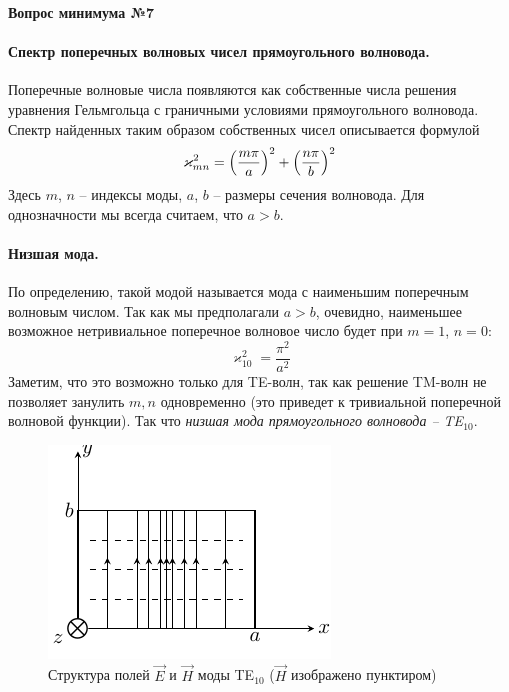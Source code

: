 \documentclass[a4paper,14pt]{extarticle}
\newcommand{\ticket}[1] {
\newpage
\hypertarget{num#1}{}
\begin{center}
	\textbf{Вопрос минимума №#1 }
\end{center}
}
\begin{document}
	





\ticket{7}
\paragraph{Спектр поперечных волновых чисел прямоугольного волновода. } Поперечные волновые числа появляются как собственные числа решения уравнения Гельмгольца с граничными условиями прямоугольного волновода. Спектр найденных таким образом собственных чисел описывается формулой
\begin{equation}
	\varkappa^2_{mn} = \qty(\frac{m\pi}{a})^2+
		\qty(\frac{n\pi}{b})^2
\end{equation}
Здесь $m$, $n$ -- индексы моды, $a$, $b$ -- размеры сечения волновода. Для однозначности мы всегда считаем, что $a>b$.

\paragraph{Низшая мода.} По определению, такой модой называется мода с наименьшим поперечным волновым числом. Так как мы предполагали $a>b$, очевидно, наименьшее возможное нетривиальное поперечное волновое число будет при $m=1$, $n=0$:
\begin{equation}
	\varkappa^2_{10} = \frac{\pi^2}{a^2}
\end{equation}
Заметим, что это возможно только для TE-волн, так как решение TM-волн не позволяет занулить $m,n$ одновременно (это приведет к тривиальной поперечной волновой функции). Так что \textit{низшая мода прямоугольного волновода -- TE${}_{10}$}.
\begin{figure}[h!]
	\centering
	\includegraphics[scale=1.5]{img/lect4_ris8} 
	\caption{Структура полей $\vec{E}$ и $\vec{H}$ моды TE${}_{10}$ ($\vec{H}$ изображено пунктиром)}
	\label{fig:lect4:8}
\end{figure}
\end{document}
